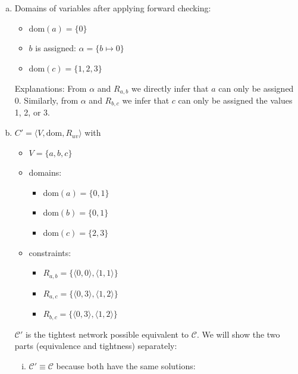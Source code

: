 \documentclass{article} %
\begin{document}
\section{}
\begin{enumerate}[(a)]
    \item Domains of variables after applying forward checking:
    \begin{itemize}
        \item dom$(a) = \{ 0 \}$
        \item $b$ is assigned: $\alpha = \{ b \mapsto 0 \}$
        \item dom$(c) = \{ 1, 2, 3 \}$
    \end{itemize}
    Explanations: From $\alpha$ and $R_{a, b}$ we directly infer
    that $a$ can only be assigned 0.
    Similarly, from $\alpha$ and $R_{b, c}$ we infer that $c$
    can only be assigned the values 1, 2, or 3.
    \item $C' = \langle V, \text{dom}, R_{uv} \rangle$ with
    \begin{itemize}
        \item $V = \{ a, b, c \}$
        \item domains:
        \begin{itemize}
            \item dom$(a) = \{ 0, 1 \}$
            \item dom$(b) = \{ 0, 1 \}$
            \item dom$(c) = \{ 2, 3 \}$
        \end{itemize}
        \item constraints:
        \begin{itemize}
            \item $R_{a,b} = \{
                \langle 0, 0 \rangle,
                \langle 1, 1 \rangle
            \}$
            \item $R_{a,c} = \{
                \langle 0, 3 \rangle,
                \langle 1, 2 \rangle
            \}$
            \item $R_{b,c} = \{
                \langle 0, 3 \rangle,
                \langle 1, 2 \rangle
            \}$
        \end{itemize}
    \end{itemize}
    $\mathcal{C}'$ is the tightest network possible equivalent to $\mathcal{C}$.
    We will show the two parts (equivalence and tightness) separately:
    \begin{enumerate}[(i)]
        \item $\mathcal{C}' \equiv \mathcal{C}$ because both have the same solutions:

\end{enumerate}
\end{enumerate}
\end{document}
